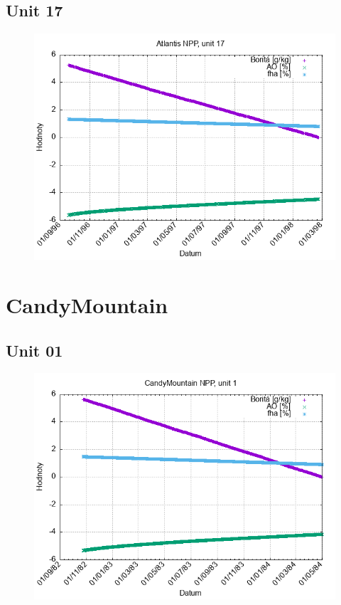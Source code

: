 \documentclass{article}
\begin{document}
\subsection*{Unit 17}
\begin{figure}[h!]
\centering
\includegraphics[width=14cm]{./grafy/Atlantis17.png}
\end{figure}
\clearpage
\section*{CandyMountain}
\subsection*{Unit 01}
\begin{figure}[h!]
\centering
\includegraphics[width=14cm]{./grafy/CandyMountain01.png}
\end{figure}
\clearpage
\end{document}
